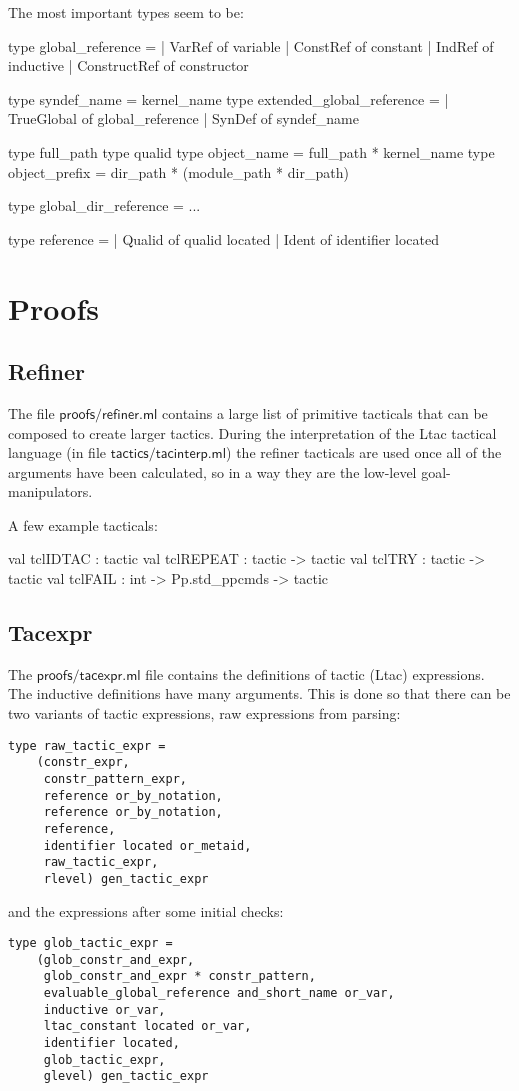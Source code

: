 \documentclass[a4paper,oneside]{book}
\newcommand{\m}[1]{\ensuremath{\mathsf{#1}}}
\begin{document}
The most important types seem to be:

\begin{code}
type global_reference =
  | VarRef of variable
  | ConstRef of constant
  | IndRef of inductive
  | ConstructRef of constructor

type syndef_name = kernel_name
type extended_global_reference =
  | TrueGlobal of global_reference
  | SynDef of syndef_name

type full_path
type qualid
type object_name = full_path * kernel_name
type object_prefix = dir_path * (module_path * dir_path)

type global_dir_reference = ...

type reference =
  | Qualid of qualid located
  | Ident of identifier located
\end{code}

\newpage

\section{Proofs}

\subsection{Refiner}

The file \m{proofs/refiner.ml} contains a large list of primitive
tacticals that can be composed to create larger tactics. During the
interpretation of the Ltac tactical language (in file
\m{tactics/tacinterp.ml}) the refiner tacticals are used once all of
the arguments have been calculated, so in a way they are the low-level
goal-manipulators.

A few example tacticals:

\begin{code}
val tclIDTAC  : tactic
val tclREPEAT : tactic -> tactic
val tclTRY    : tactic -> tactic
val tclFAIL   : int -> Pp.std_ppcmds -> tactic
\end{code}

\subsection{Tacexpr}

The \m{proofs/tacexpr.ml} file contains the definitions of tactic
(Ltac) expressions. The inductive definitions have many
arguments. This is done so that there can be two variants of tactic
expressions, raw expressions from parsing:
\begin{lstlisting}
type raw_tactic_expr =
    (constr_expr,
     constr_pattern_expr,
     reference or_by_notation,
     reference or_by_notation,
     reference,
     identifier located or_metaid,
     raw_tactic_expr,
     rlevel) gen_tactic_expr
\end{lstlisting}
and the expressions after some initial checks:
\begin{lstlisting}
type glob_tactic_expr =
    (glob_constr_and_expr,
     glob_constr_and_expr * constr_pattern,
     evaluable_global_reference and_short_name or_var,
     inductive or_var,
     ltac_constant located or_var,
     identifier located,
     glob_tactic_expr,
     glevel) gen_tactic_expr
\end{lstlisting}
\end{document}
